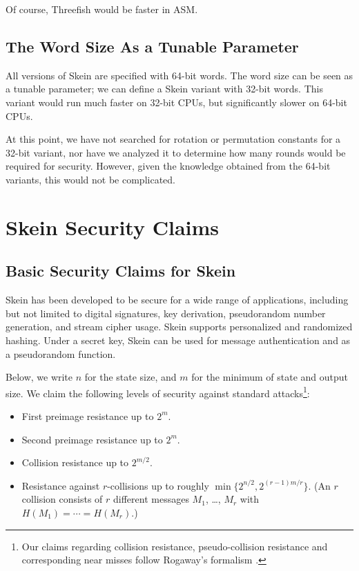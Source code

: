 \documentclass[11pt,twoside]{article}
\begin{document}
Of course, Threefish would be faster in ASM.

\subsection{The Word Size As a Tunable Parameter}

All versions of Skein are specified with 64-bit words. The word size can be seen as a tunable parameter; we can define a Skein variant with 32-bit words. This variant would run much faster on 32-bit CPUs, but significantly slower on 64-bit CPUs.

At this point, we have not searched for rotation or permutation constants for a 32-bit variant, nor have we analyzed it to determine how many rounds would be required for security. However, given the knowledge obtained from the 64-bit variants, this would not be complicated.

\section{Skein Security Claims}

\subsection{Basic Security Claims for Skein}

Skein has been developed to be secure for a wide range of applications, including but not limited to digital signatures, key derivation, pseudorandom number generation, and stream cipher usage. Skein supports personalized and randomized hashing. Under a secret key, Skein can be used for message authentication and as a pseudorandom function.

Below, we write $n$ for the state size, and $m$ for the minimum of state and output size. We claim the following levels of security against standard attacks\footnote{Our claims regarding collision resistance, pseudo-collision resistance and corresponding near misses follow Rogaway's formalism \cite{Ro06}.}:

\begin{itemize}
\item First preimage resistance up to $2^m$.
\item Second preimage resistance up to $2^{m}$.
\item Collision resistance up to $2^{m/2}$.
\item Resistance against $r$-collisions up to roughly $\min\{2^{n/2},2^{(r-1)m/r}\}$. (An $r$ collision consists of $r$ different messages $M_1$, \ldots, $M_r$ with $H(M_1)= \cdots= H(M_r)$.)
\end{itemize}
\end{document}

